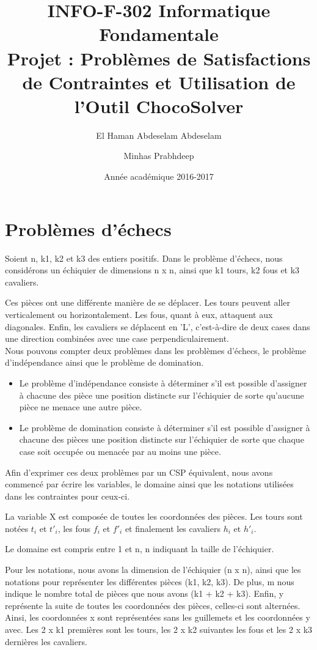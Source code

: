 \documentclass{article}
\title{INFO-F-302 Informatique Fondamentale\\ Projet : Problèmes de Satisfactions de Contraintes et Utilisation de l’Outil ChocoSolver}
\author{El Haman Abdeselam Abdeselam \and Minhas Prabhdeep}
\date{Année académique 2016-2017}
\begin{document}
\maketitle

\section{Problèmes d'échecs}
Soient n, k1, k2 et k3 des entiers positifs.
Dans le problème d'échecs, nous considérons un échiquier de dimensions n x n, ainsi que k1 tours, k2 fous et k3 cavaliers. 

Ces pièces ont une différente manière de se déplacer. Les tours peuvent aller verticalement ou horizontalement. Les fous, quant à eux, attaquent aux diagonales. Enfin, les cavaliers se déplacent en 'L', c’est-à-dire de deux cases dans une direction combinées avec une case perpendiculairement. \\

Nous pouvons compter deux problèmes dans les problèmes d'échecs, le problème d'indépendance ainsi que le problème de domination.
\begin{itemize}
\item Le problème d'indépendance consiste à déterminer s'il est possible d'assigner à chacune des pièce une position distincte sur l'échiquier de sorte qu'aucune pièce ne menace une autre pièce.
\item Le problème de domination consiste à déterminer s'il est possible d'assigner à chacune des pièces une position distincte sur l'échiquier de sorte que chaque case soit occupée ou menacée par au moins une pièce. \\
\end{itemize}

Afin d'exprimer ces deux problèmes par un CSP équivalent, nous avons commencé par écrire les variables, le domaine ainsi que les notations utilisées dans les contraintes pour ceux-ci.

La variable X est composée de toutes les coordonnées des pièces. Les tours sont notées $t_{i}$ et $t'_{i}$, les fous $f_{i}$ et $f'_{i}$ et finalement les cavaliers $h_{i}$ et $h'_{i}$.

Le domaine est compris entre 1 et n, n indiquant la taille de l'échiquier.

Pour les notations, nous avons la dimension de l'échiquier (n x n), ainsi que les notations pour représenter les différentes pièces (k1, k2, k3). 
De plus, m nous indique le nombre total de pièces que nous avons (k1 + k2 + k3). 
Enfin, y représente la suite de toutes les coordonnées des pièces, celles-ci sont alternées. Ainsi, les coordonnées x sont représentées sans les guillemets et les coordonnées y avec. Les 2 x k1 premières sont les tours, les 2 x k2 suivantes les fous et les 2 x k3 dernières les cavaliers.
\end{document}
